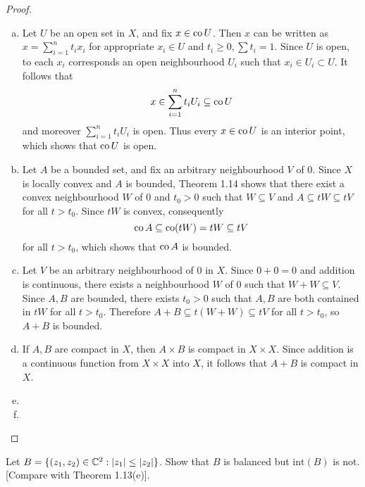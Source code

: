 \begin{proof} 
	\begin{enumerate}[(a)]
		\item Let $U$ be an open set in $X$, and fix $x \in \operatorname{co} U$. Then $x$ can be written as $x = \sum_{i=1}^n t_i x_i$ for appropriate $x_i \in U$ and $t_i \ge 0, \sum t_i = 1$. Since $U$ is open, to each $x_i$ corresponds an open neighbourhood $U_i$ such that $x_i \in U_i \subset U$. It follows that
		\begin{equation*}
			x \in \sum_{i=1}^n t_i U_i \subseteq \operatorname{co} U
		\end{equation*}
		and moreover $\sum_{i=1}^n t_i U_i$ is open. Thus every $x \in \operatorname{co} U$ is an interior point, which shows that $\operatorname{co} U$ is open.
		
		\item Let $A$ be a bounded set, and fix an arbitrary neighbourhood $V$ of 0. Since $X$ is locally convex and $A$ is bounded, Theorem 1.14 shows that there exist a convex neighbourhood $W$ of 0 and $t_0>0$ such that $W \subseteq V$ and $A \subseteq tW \subseteq tV$ for all $t>t_0$. Since $tW$ is convex, consequently
		\begin{equation*}
			\operatorname{co} A \subseteq \operatorname{co}(tW) = tW \subseteq tV
		\end{equation*}
		for all $t>t_0$, which shows that $\operatorname{co} A$ is bounded.
		
		\item Let $V$ be an arbitrary neighbourhood of 0 in $X$. Since $0+0=0$ and addition is continuous, there exists a neighbourhood $W$ of 0 such that $W+W \subseteq V$. Since $A, B$ are bounded, there exists $t_0>0$ such that $A, B$ are both contained in $tW$ for all $t>t_0$. Therefore $A+B \subseteq t(W+W) \subseteq tV$ for all $t>t_0$, so $A+B$ is bounded.
		
		\item If $A, B$ are compact in $X$, then $A \times B$ is compact in $X \times X$. Since addition is a continuous function from $X \times X$ into $X$, it follows that $A+B$ is compact in $X$.
		
		\item
		
		\item
	\end{enumerate}
\end{proof}

\begin{exercise}
	Let $B = \{ (z_1,z_2) \in \mathbb{C}^2 : |z_1|\le |z_2| \}$. Show that $B$ is balanced but $\text{int}(B)$ is not. [Compare with Theorem 1.13(e)].
\end{exercise}

